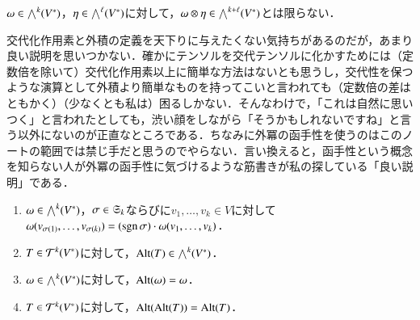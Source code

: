 \begin{que}
$\omega \in \bigwedge^k(V^*)$，$\eta \in \bigwedge^\ell(V^*)$に対して，$\omega \otimes \eta \in \bigwedge^{k + \ell}(V^*)$とは限らない．
\end{que}

\begin{que}[*]
交代化作用素と外積の定義を天下りに与えたくない気持ちがあるのだが，あまり良い説明を思いつかない．確かにテンソルを交代テンソルに化かすためには（定数倍を除いて）交代化作用素以上に簡単な方法はないとも思うし，交代性を保つような演算として外積より簡単なものを持ってこいと言われても（定数倍の差はともかく）（少なくとも私は）困るしかない．そんなわけで，「これは自然に思いつく」と言われたとしても，渋い顔をしながら「そうかもしれないですね」と言う以外にないのが正直なところである．ちなみに外冪の函手性を使うのはこのノートの範囲では禁じ手だと思うのでやらない．言い換えると，函手性という概念を知らない人が外冪の函手性に気づけるような筋書きが私の探している「良い説明」である．
\end{que}

\begin{prop}[交代化作用素の基本性質]\label{交代化作用素の基本性質}
\leavevmode
\begin{enumerate}
\item $\omega \in \bigwedge^k(V^*)$，$\sigma \in \mathfrak{S}_k$ならびに$v_1, \dots, v_k \in V$に対して$\omega(v_{\sigma(1)},\dots,v_{\sigma(k)}) = (\operatorname{sgn} \sigma)\cdot \omega(v_1, \dots, v_k)$．
\item $T \in \mathcal{T}^k(V^*)$に対して，$\operatorname{Alt}(T) \in \bigwedge^k(V^*)$．
\item $\omega \in \bigwedge^k(V^*)$に対して，$\operatorname{Alt}(\omega) = \omega$．
\item $T \in \mathcal{T}^k(V^*)$に対して，$\operatorname{Alt}(\operatorname{Alt}(T)) = \operatorname{Alt}(T)$．
\end{enumerate}
\end{prop}

